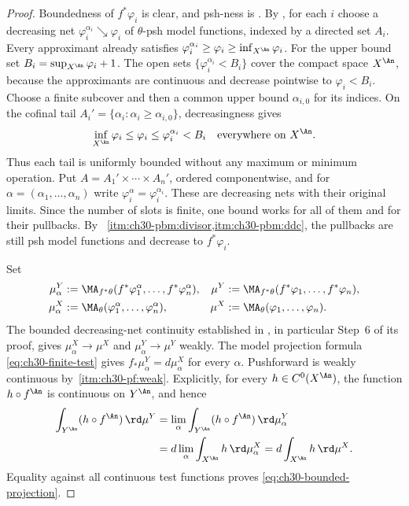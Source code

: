 \begin{proof}
Boundedness of \(f^*\varphi_i\) is clear, and psh-ness is
.  By
, for each \(i\) choose a
decreasing net \(\varphi_i^{\alpha_i}\searrow\varphi_i\) of
\(\theta\)-psh model functions, indexed by a directed set \(A_i\).
Every approximant already satisfies
\(\varphi_i^{\alpha_i}\geq\varphi_i\geq\inf_{X^{\An}}\varphi_i\).
For the upper bound set \(B_i=\sup_{X^{\An}}\varphi_i+1\).
The open sets \(\{\varphi_i^{\alpha_i}<B_i\}\) cover the compact space
\(X^{\An}\), because the approximants are continuous and decrease
pointwise to \(\varphi_i<B_i\).  Choose a finite subcover and then a
common upper bound \(\alpha_{i,0}\) for its indices.  On the cofinal tail
\(A_i'=\{\alpha_i:\alpha_i\geq\alpha_{i,0}\}\), decreasingness gives
\[
 \inf_{X^{\An}}\varphi_i\leq\varphi_i\leq
 \varphi_i^{\alpha_i}<B_i
 \quad\text{everywhere on }X^{\An}.
\]
Thus each tail is uniformly bounded without any maximum or minimum
operation.  Put \(A=A_1'\times\cdots\times A_n'\), ordered
componentwise, and for \(\alpha=(\alpha_1,\ldots,\alpha_n)\) write
\(\varphi_i^\alpha=\varphi_i^{\alpha_i}\).
These are decreasing nets with their original limits.  Since the number
of slots is finite, one bound works for all of them and for their
pullbacks.  By \,
\cref{itm:ch30-pbm:divisor,itm:ch30-pbm:ddc}, the pullbacks are still
psh model functions and decrease to \(f^*\varphi_i\).

Set
\[
 \begin{aligned}
 \mu_\alpha^Y
   &:=\MA_{f^*\theta}(f^*\varphi_1^\alpha,\ldots,
      f^*\varphi_n^\alpha),&
 \mu^Y
   &:=\MA_{f^*\theta}(f^*\varphi_1,\ldots,f^*\varphi_n),\\
 \mu_\alpha^X
   &:=\MA_\theta(\varphi_1^\alpha,\ldots,\varphi_n^\alpha),&
 \mu^X
   &:=\MA_\theta(\varphi_1,\ldots,\varphi_n).
 \end{aligned}
\]
The bounded decreasing-net continuity established in
, in particular Step~6 of its proof,
gives \(\mu_\alpha^X\to\mu^X\) and \(\mu_\alpha^Y\to\mu^Y\) weakly.
The model projection formula \eqref{eq:ch30-finite-test} gives
\(f_*\mu_\alpha^Y=d\mu_\alpha^X\) for every \(\alpha\).
Pushforward is weakly continuous by
\,\cref{itm:ch30-pf:weak}.
Explicitly, for every \(h\in C^0(X^{\An})\), the function
\(h\circ f^{\An}\) is continuous on \(Y^{\An}\), and hence
\[
 \begin{aligned}
 \int_{Y^{\An}}(h\circ f^{\An})\,\rd\mu^Y
 &=\lim_\alpha\int_{Y^{\An}}(h\circ f^{\An})\,\rd\mu_\alpha^Y\\
 &=d\lim_\alpha\int_{X^{\An}}h\,\rd\mu_\alpha^X
  =d\int_{X^{\An}}h\,\rd\mu^X.
 \end{aligned}
\]
Equality against all continuous test functions proves
\eqref{eq:ch30-bounded-projection}.
\end{proof}


